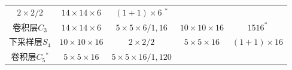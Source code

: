 \documentclass[12pt,a4paper,UTF8,twoside]{book}
\begin{document}
\begin{longtable}[]{@{}ccccc@{}}
\begin{minipage}[t]{0.19\columnwidth}
\(2\times2/2\)\strut
\end{minipage} & \begin{minipage}[t]{0.16\columnwidth}\centering
\(14\times14\times6\)\strut
\end{minipage} & \begin{minipage}[t]{0.24\columnwidth}\centering
\((1+1)\times6\) \(^*\)\strut
\end{minipage}\tabularnewline
\begin{minipage}[t]{0.12\columnwidth}\centering
卷积层\(C_3\)\strut
\end{minipage} & \begin{minipage}[t]{0.16\columnwidth}\centering
\(14\times14\times6\)\strut
\end{minipage} & \begin{minipage}[t]{0.19\columnwidth}\centering
\(5\times5\times6/1,16\)\strut
\end{minipage} & \begin{minipage}[t]{0.16\columnwidth}\centering
\(10\times10\times16\)\strut
\end{minipage} & \begin{minipage}[t]{0.24\columnwidth}\centering
\(1516^*\)\strut
\end{minipage}\tabularnewline
\begin{minipage}[t]{0.12\columnwidth}\centering
下采样层\(S_4\)\strut
\end{minipage} & \begin{minipage}[t]{0.16\columnwidth}\centering
\(10\times10\times16\)\strut
\end{minipage} & \begin{minipage}[t]{0.19\columnwidth}\centering
\(2\times2/2\)\strut
\end{minipage} & \begin{minipage}[t]{0.16\columnwidth}\centering
\(5\times5\times16\)\strut
\end{minipage} & \begin{minipage}[t]{0.24\columnwidth}\centering
\((1+1)\times16\)\strut
\end{minipage}\tabularnewline
\begin{minipage}[t]{0.12\columnwidth}\centering
卷积层\(C_5\)\(^*\)\strut
\end{minipage} & \begin{minipage}[t]{0.16\columnwidth}\centering
\(5\times5\times16\)\strut
\end{minipage} & \begin{minipage}[t]{0.19\columnwidth}\centering
\(5\times5\times16/1,120\)\strut

\end{minipage}
\end{longtable}
\end{document}
